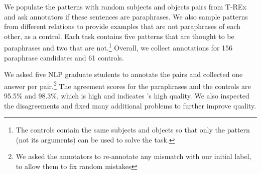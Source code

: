 
We populate the patterns with random subjects and objects pairs from T-REx \cite{trex} and ask annotators if these sentences are paraphrases.
We also sample patterns from different relations to provide
examples that are not paraphrases of each other, as a control.
Each task contains five patterns that are thought to be paraphrases and two that are not.\footnote{The controls contain the same subjects and objects so that only the pattern (not its arguments) can be used to solve the task.}
Overall, we collect annotations for 156 paraphrase candidates and 61 controls.


We asked five NLP graduate students to annotate the pairs and collected one answer per pair.\footnote{We asked the annotators to re-annotate any mismatch with our initial label, to allow them to fix random mistakes}
The agreement scores for the paraphrases and the controls
are 95.5\% and 98.3\%, which is high and
indicates \resource's high quality.
We also inspected  the disagreements  %
and fixed many additional problems %
to further improve quality.
% 



